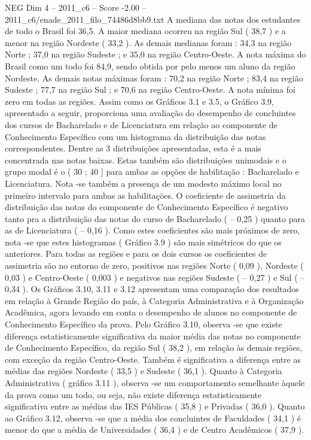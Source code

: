 \begin{textsample}{NEG Dim 4 – 2011\_c6 – Score -2.00 – 2011\_c6/enade\_2011\_filo\_74486d8bb9.txt}
A mediana das notas dos estudantes de todo o Brasil foi 36,5.
A maior mediana ocorreu na região Sul ( 38,7 ) e a menor na região Nordeste ( 33,2 ).
As demais medianas foram : 34,3 na região Norte ; 37,0 na região Sudeste ; e 35,0 na região Centro-Oeste.
A nota máxima do Brasil como um todo foi 84,9, sendo obtida por pelo menos um aluno da região Nordeste.
As demais notas máximas foram : 70,2 na região Norte ; 83,4 na região Sudeste ; 77,7 na região Sul ; e 70,6 na região Centro-Oeste.
A nota mínima foi zero em todas as regiões.
Assim como os Gráficos 3.1 e 3.5, o Gráfico 3.9, apresentado a seguir, proporciona uma avaliação do desempenho de concluintes dos cursos de Bacharelado e de Licenciatura em relação ao componente de Conhecimento Específico com um histograma da distribuição das notas correspondentes.
Dentre as 3 distribuições apresentadas, esta é a mais concentrada nas notas baixas.
Estas também são distribuições unimodais e o grupo modal é o ( 30 ; 40 ] para ambas as opções de habilitação : Bacharelado e Licenciatura.
Nota -se também a presença de um modesto máximo local no primeiro intervalo para ambas as habilitações.
O coeficiente de assimetria da distribuição das notas do componente de Conhecimento Específico é negativo tanto pra a distribuição das notas do curso de Bacharelado ( – 0,25 ) quanto para as de Licenciatura ( – 0,16 ).
Como estes coeficientes são mais próximos de zero, nota -se que estes histogramas ( Gráfico 3.9 ) são mais simétricos do que os anteriores.
Para todas as regiões e para os dois cursos os coeficientes de assimetria são no entorno de zero, positivos nas regiões Norte ( 0,09 ), Nordeste ( 0,03 ) e Centro-Oeste ( 0,003 ) e negativos nas regiões Sudeste ( – 0,27 ) e Sul ( – 0,34 ).
Os Gráficos 3.10, 3.11 e 3.12 apresentam uma comparação dos resultados em relação à Grande Região do país, à Categoria Administrativa e à Organização Acadêmica, agora levando em conta o desempenho de alunos no componente de Conhecimento Específico da prova.
Pelo Gráfico 3.10, observa -se que existe diferença estatisticamente significativa da maior média das notas no componente de Conhecimento Específico, da região Sul ( 38,2 ), em relação às demais regiões, com exceção da região Centro-Oeste.
Também é significativa a diferença entre as médias das regiões Nordeste ( 33,5 ) e Sudeste ( 36,1 ).
Quanto à Categoria Administrativa ( gráfico 3.11 ), observa -se um comportamento semelhante àquele da prova como um todo, ou seja, não existe diferença estatisticamente significativa entre as médias das IES Públicas ( 35,8 ) e Privadas ( 36,0 ).
Quanto ao Gráfico 3.12, observa -se que a média dos concluintes de Faculdades ( 34,1 ) é menor do que a média de Universidades ( 36,4 ) e de Centro Acadêmicos ( 37,9 ).

\end{textsample}
